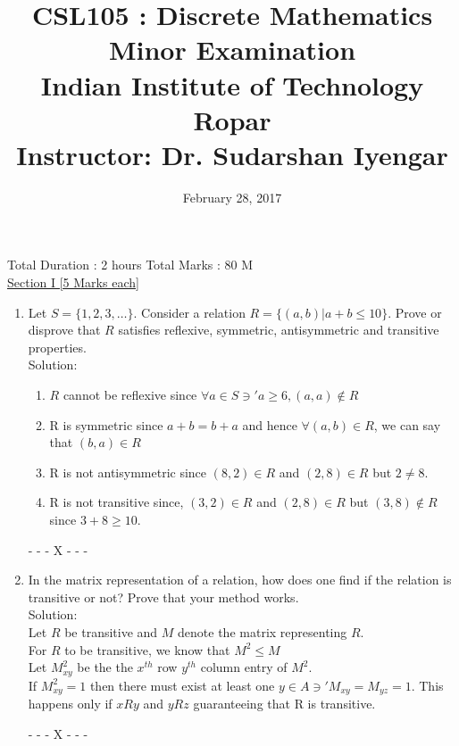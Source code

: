 \documentclass{article}
\title{CSL105 : Discrete Mathematics\\
\large{Minor Examination}\\
\large{Indian Institute of Technology Ropar}\\
\small{Instructor: Dr. Sudarshan Iyengar}
}
\date{February 28, 2017}
\begin{document}
\maketitle
Total Duration : 2 hours \hfill Total Marks : 80 M\\

\underline{\large{Section I \hspace*{7cm} [5 Marks each]}}
\begin{enumerate} 
    \item Let $S=\{1,2,3,\dots\}$. Consider a relation $R=\{(a,b)|a+b\leq 10\}$. Prove or disprove that $R$ satisfies reflexive, symmetric, antisymmetric and transitive properties.\\
    
Solution: \\
\begin{enumerate}
\item $R$ cannot be reflexive since $\forall a \in S \ni' a \geq 6, (a,a) \notin R$
\item R is symmetric since $a+b = b+a$ and hence $\forall (a,b) \in R$, we can say that $(b,a) \in R$
\item R is not antisymmetric since $(8,2) \in R$ and $(2,8) \in R$ but $2 \neq 8$. 
\item R is not transitive since, $(3,2) \in R$ and $(2,8) \in R$ but $(3,8) \notin R$ since $3+8 \geq 10$. 
\end{enumerate}
\begin{center}
- - - X - - -
\end{center}

    \item In the matrix representation of a relation, how does one find if the relation is transitive or not? Prove that your method works. \\ 
Solution: \\
Let $R$ be transitive and $M$ denote the matrix representing $R$.\\
For $R$ to be transitive, we know that $M^2 \leq M$\\

Let $M^2_{xy}$ be the the $x^{th}$ row $y^{th}$ column entry of $M^2$.\\ 
If $M^2_{xy} =1$ then there must exist at least one $y \in A \ni' M_{xy} = M_{yz} = 1$. This happens only if $xRy$ and $yRz$ guaranteeing that R is transitive.   

\begin{center}
- - - X - - -
\end{center}
    

\end{enumerate}
\end{document}
